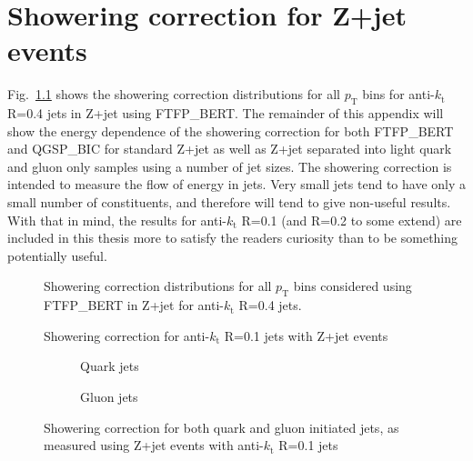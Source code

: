 \chapter{ Showering correction for Z+jet events}
Fig.~\ref{plot:ZJetShoweringDists4App} shows the showering correction distributions for all $p_{\mathrm T}$ bins for anti-$k_{\mathrm t}$ R=0.4 jets in Z+jet using FTFP\_BERT.  
The remainder of this appendix will show the energy dependence of the showering correction for both FTFP\_BERT and QGSP\_BIC for standard Z+jet as well as Z+jet separated into light quark and gluon only samples using a number of jet sizes.  
The showering correction is intended to measure the flow of energy in jets.
Very small jets tend to have only a small number of constituents, and therefore will tend to give non-useful results.
With that in mind, the results for anti-$k_{\mathrm t}$ R=0.1 (and R=0.2 to some extend) are included in this thesis more to satisfy the readers curiosity than to be something potentially useful.


\begin{figure}[!ht]
 \centering
 \caption[Showering correction distributions, anti-$k_{\mathrm t}$ R=0.4 with FTFP\_BERT]
 {\small Showering correction distributions for all $p_{\mathrm T}$ bins considered using FTFP\_BERT in Z+jet for anti-$k_{\mathrm t}$ R=0.4 jets.  } 
 \label{plot:ZJetShoweringDists4App}
\end{figure}
\clearpage

\begin{figure}[!ht]
 \centering
 \caption[Showering correction for anti-$k_{\mathrm t}$ R=0.1 jets with Z+jet events]
 {\small Showering correction for anti-$k_{\mathrm t}$ R=0.1 jets with Z+jet events}
 \label{plot:ZJetShowering1App}
\end{figure}

\begin{figure}[!ht]
 \centering
 \begin{subfigure}{.5\textwidth}
  \centering
  \caption{Quark jets}
 \end{subfigure}%
 \begin{subfigure}{.5\textwidth}
  \centering
  \caption{Gluon jets}
 \end{subfigure}
 \caption[Quark/gluon jet showering correction, anti-$k_{\mathrm t}$ R=0.1, Z+jet]
 {\small Showering correction for both quark and gluon initiated jets, as measured using Z+jet events with anti-$k_{\mathrm t}$ R=0.1 jets}
 \label{plot:ZJetShoweringFlav1App}
\end{figure}

